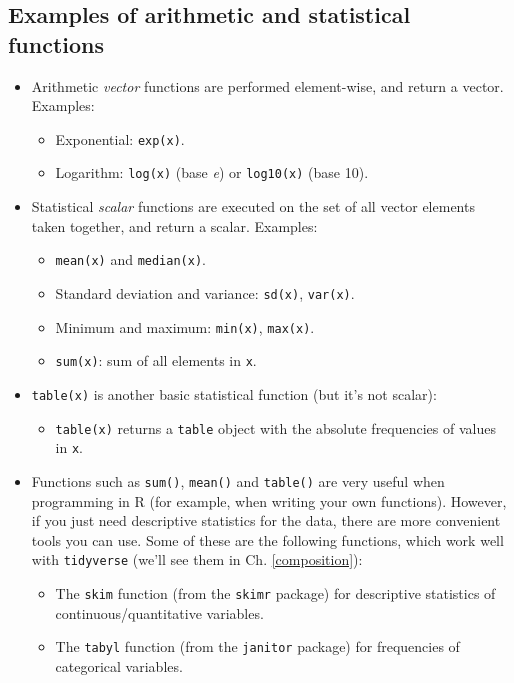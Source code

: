 \documentclass[
]{book}
\providecommand{\tightlist}{%
  \setlength{\itemsep}{0pt}\setlength{\parskip}{0pt}}
\begin{document}
\hypertarget{examples-of-arithmetic-and-statistical-functions}{%
\subsection{Examples of arithmetic and statistical functions}\label{examples-of-arithmetic-and-statistical-functions}}

\begin{itemize}
\tightlist
\item
  Arithmetic \emph{vector} functions are performed element-wise, and return a vector. Examples:

  \begin{itemize}
  \tightlist
  \item
    Exponential: \texttt{exp(x)}.
  \item
    Logarithm: \texttt{log(x)} (base \emph{e}) or \texttt{log10(x)} (base 10).
  \end{itemize}
\item
  Statistical \emph{scalar} functions are executed on the set of all vector elements taken together, and return a scalar. Examples:

  \begin{itemize}
  \tightlist
  \item
    \texttt{mean(x)} and \texttt{median(x)}.
  \item
    Standard deviation and variance: \texttt{sd(x)}, \texttt{var(x)}.
  \item
    Minimum and maximum: \texttt{min(x)}, \texttt{max(x)}.
  \item
    \texttt{sum(x)}: sum of all elements in \texttt{x}.
  \end{itemize}
\item
  \texttt{table(x)} is another basic statistical function (but it's not scalar):

  \begin{itemize}
  \tightlist
  \item
    \texttt{table(x)} returns a \texttt{table} object with the absolute frequencies of values in \texttt{x}.
  \end{itemize}
\item
  Functions such as \texttt{sum()}, \texttt{mean()} and \texttt{table()} are very useful when programming in R (for example, when writing your own functions). However, if you just need descriptive statistics for the data, there are more convenient tools you can use. Some of these are the following functions, which work well with \texttt{tidyverse} (we'll see them in Ch. \ref{composition}):

  \begin{itemize}
  \tightlist
  \item
    The \texttt{skim} function (from the \texttt{skimr} package) for descriptive statistics of continuous/quantitative variables.
  \item
    The \texttt{tabyl} function (from the \texttt{janitor} package) for frequencies of categorical variables.
  \end{itemize}
\end{itemize}
\end{document}
